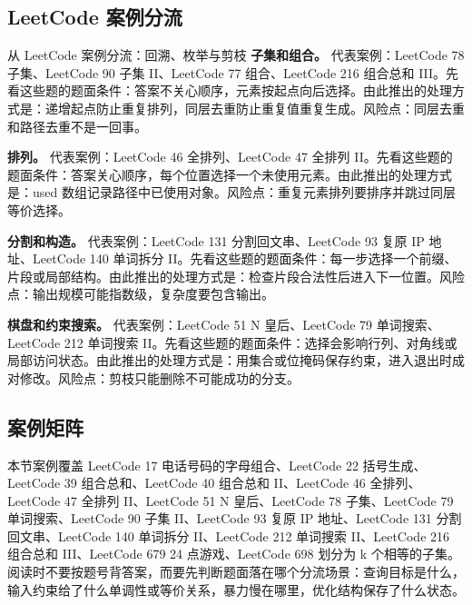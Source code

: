 \subsection{LeetCode 案例分流}

\begin{principlebox}{从 LeetCode 案例分流：回溯、枚举与剪枝}
\textbf{子集和组合。}
代表案例：LeetCode 78 子集、LeetCode 90 子集 II、LeetCode 77 组合、LeetCode 216 组合总和 III。先看这些题的题面条件：答案不关心顺序，元素按起点向后选择。由此推出的处理方式是：递增起点防止重复排列，同层去重防止重复值重复生成。风险点：同层去重和路径去重不是一回事。

\textbf{排列。}
代表案例：LeetCode 46 全排列、LeetCode 47 全排列 II。先看这些题的题面条件：答案关心顺序，每个位置选择一个未使用元素。由此推出的处理方式是：used 数组记录路径中已使用对象。风险点：重复元素排列要排序并跳过同层等价选择。

\textbf{分割和构造。}
代表案例：LeetCode 131 分割回文串、LeetCode 93 复原 IP 地址、LeetCode 140 单词拆分 II。先看这些题的题面条件：每一步选择一个前缀、片段或局部结构。由此推出的处理方式是：检查片段合法性后进入下一位置。风险点：输出规模可能指数级，复杂度要包含输出。

\textbf{棋盘和约束搜索。}
代表案例：LeetCode 51 N 皇后、LeetCode 79 单词搜索、LeetCode 212 单词搜索 II。先看这些题的题面条件：选择会影响行列、对角线或局部访问状态。由此推出的处理方式是：用集合或位掩码保存约束，进入退出时成对修改。风险点：剪枝只能删除不可能成功的分支。

\end{principlebox}

\subsection{案例矩阵}

本节案例覆盖 LeetCode 17 电话号码的字母组合、LeetCode 22 括号生成、LeetCode 39 组合总和、LeetCode 40 组合总和 II、LeetCode 46 全排列、LeetCode 47 全排列 II、LeetCode 51 N 皇后、LeetCode 78 子集、LeetCode 79 单词搜索、LeetCode 90 子集 II、LeetCode 93 复原 IP 地址、LeetCode 131 分割回文串、LeetCode 140 单词拆分 II、LeetCode 212 单词搜索 II、LeetCode 216 组合总和 III、LeetCode 679 24 点游戏、LeetCode 698 划分为 k 个相等的子集。阅读时不要按题号背答案，而要先判断题面落在哪个分流场景：查询目标是什么，输入约束给了什么单调性或等价关系，暴力慢在哪里，优化结构保存了什么状态。

